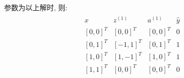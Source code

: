 \documentclass[]{subfiles}
\begin{document}
参数为以上解时, 则:
\begin{align*}
\begin{array}{cccc}
    x & z^{(1)} & a^{(1)} & \hat{y} \\
    \hline
    [0,0]^T & [0,0]^T & [0,0]^T & 0 \\
    {[0,1]^T} & [-1,1]^T & [0,1]^T & 1 \\
    {[1,0]^T} & [1,-1]^T & [1,0]^T & 1 \\
    {[1,1]^T} & [0,0]^T & [0,0]^T & 0
\end{array}
\end{align*}
\end{document}
